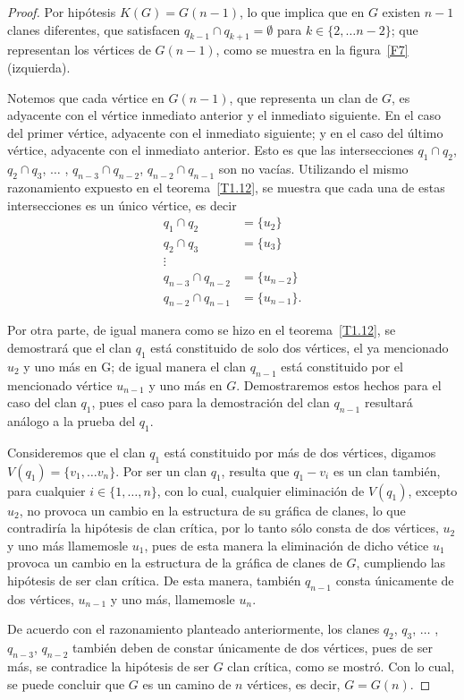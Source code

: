 \documentclass[12pt]{book}
\theoremstyle{definition}
\begin{document}
\begin{proof}
Por hipótesis $K(G)=G(n-1)$, lo que implica que en $G$ existen $n-1$ clanes diferentes, que satisfacen $q_{k-1}\cap q_{k+1}=\emptyset$ para $k\in\{2,\dots n-2\}$; que representan los vértices de $G(n-1)$, como se muestra en la figura~\ref{F7} (izquierda).

Notemos que cada vértice en $G(n-1)$, que representa un clan de $G$, es adyacente con el vértice inmediato anterior y el inmediato siguiente. En el caso del primer vértice, adyacente con el inmediato siguiente; y en el caso del último vértice, adyacente con el inmediato anterior. Esto es que las intersecciones $q_1\cap q_2$, $q_2\cap q_3$, $\dots$ , $q_{n-3}\cap q_{n-2}$, $q_{n-2}\cap q_{n-1}$ son no vacías. Utilizando el mismo razonamiento expuesto en el teorema~\ref{T1.12}, se muestra que cada una de estas intersecciones es un único vértice, es decir
\begin{equation*}
\begin{aligned}
q_1\cap q_2 &= \{u_2\} \\
q_2\cap q_3 &= \{u_3\} \\
\vdots \\
q_{n-3}\cap q_{n-2} &= \{u_{n-2}\} \\
q_{n-2}\cap q_{n-1} &= \{u_{n-1}\}.
\end{aligned}
\end{equation*}

Por otra parte, de igual manera como se hizo en el teorema~\ref{T1.12}, se demostrará que el clan $q_1$ está constituido de solo dos vértices, el ya mencionado $u_2$ y uno más en G; de igual manera el clan $q_{n-1}$ está constituido por el mencionado vértice $u_{n-1}$ y uno más en $G$. Demostraremos estos hechos para el caso del clan $q_1$, pues el caso para la demostración del clan $q_{n-1}$ resultará análogo a la prueba del $q_1$. 

Consideremos que el clan $q_1$ está constituido por más de dos vértices, digamos $V(q_1)=\{v_1,\dots v_n\}$. Por ser un clan $q_1$, resulta que $q_1-v_i$ es un clan también, para cualquier $i\in \{1,\dots,n\}$, con lo cual, cualquier eliminación de $V(q_1)$, excepto $u_2$, no provoca un cambio en la estructura de su gráfica de clanes, lo que contradiría la hipótesis de clan crítica, por lo tanto sólo consta de dos vértices, $u_2$ y uno más llamemosle $u_1$, pues de esta manera la eliminación de dicho vétice $u_1$ provoca un cambio en la estructura de la gráfica de clanes de $G$, cumpliendo las hipótesis de ser clan crítica. 
De esta manera, también $q_{n-1}$ consta únicamente de dos vértices, $u_{n-1}$ y uno más, llamemosle $u_n$.

De acuerdo con el razonamiento planteado anteriormente, los clanes $q_2$, $q_3$, $\dots$ , $q_{n-3}$, $q_{n-2}$ también deben de constar únicamente de dos vértices, pues de ser más, se contradice la hipótesis de ser $G$ clan crítica, como se mostró. Con lo cual, se puede concluir que $G$ es un camino de $n$ vértices, es decir, $G=G(n)$.
\end{proof}
\end{document}

